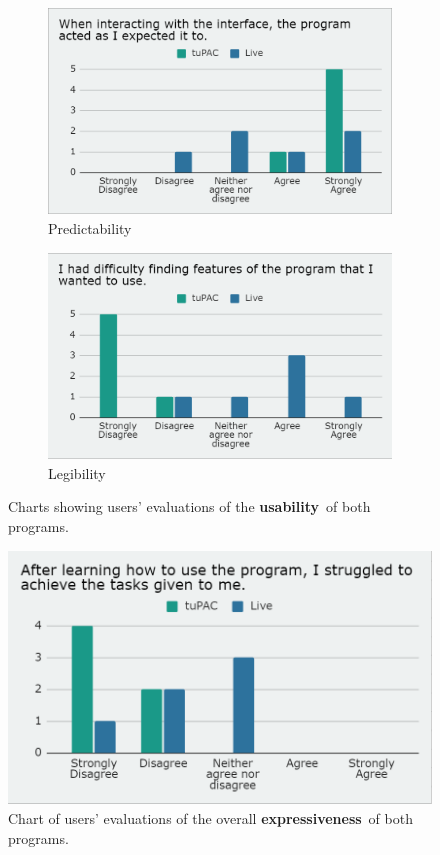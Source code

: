\documentclass[12pt,a4paper,oneside,openright]{report}
\newcommand{\usability}{\textbf{usability}}
\newcommand{\expressiveness}{\textbf{expressiveness}}
\begin{document}
\begin{figure}[h]
\centering
\begin{subfigure}{.5\textwidth}
  \centering
  \includegraphics[width=.9\linewidth]{images/questionnaire/predictability.png}
  \caption{Predictability}
  \label{fig:q_predict}
\end{subfigure}%
\begin{subfigure}{.5\textwidth}
  \centering
  \includegraphics[width=.9\linewidth]{images/questionnaire/legibility.png}
  \caption{Legibility}
  \label{fig:q_leg}
\end{subfigure}
\caption{Charts showing users' evaluations of the \usability\ of both programs.}
\label{fig:q_3}
\end{figure}

\begin{figure}[h!]
    \centering
    \includegraphics[width=.45\linewidth]{images/questionnaire/usability.png}
    \caption{Chart of users' evaluations of the overall \expressiveness\ of both programs.}
    \label{fig:q_expr}
\end{figure}
\end{document}
